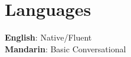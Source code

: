 \documentclass[letterpaper,11pt]{article}
\begin{document}
\section{Languages}
 \begin{itemize}[leftmargin=0.15in, label={}]
    \small{\item{
     \textbf{English}{: Native/Fluent} \\
     \textbf{Mandarin}{: Basic Conversational} \\
    }}
 \end{itemize}


\end{document}
